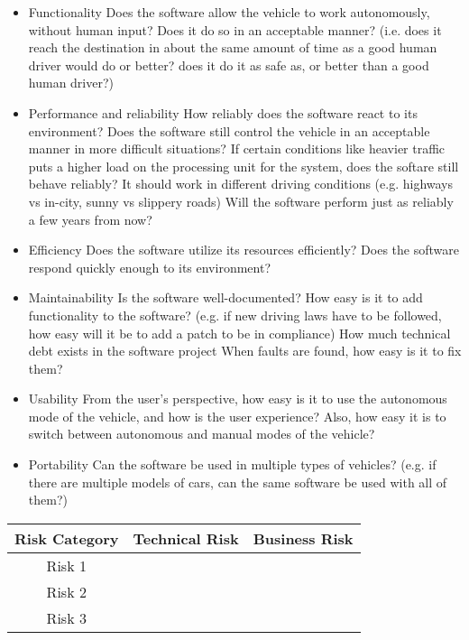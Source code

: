 \documentclass[letterpaper]{article}
\begin{document}
\begin{itemize}
	\item Functionality
		Does the software allow the vehicle to work autonomously, without human input? 
		Does it do so in an acceptable manner? 
		(i.e. does it reach the destination in about the same amount of time as a good human driver would do or better?
		does it do it as safe as, or better than a good human driver?)
	\item Performance and reliability
		How reliably does the software react to its environment?
		Does the software still control the vehicle in an acceptable manner in more difficult situations?
		If certain conditions like heavier traffic puts a higher load on the processing unit for the system, does the softare still behave reliably?
		It should work in different driving conditions (e.g. highways vs in-city, sunny vs slippery roads)
		Will the software perform just as reliably a few years from now?
	\item Efficiency
		Does the software utilize its resources efficiently?
		Does the software respond quickly enough to its environment?
	\item Maintainability
		Is the software well-documented?
		How easy is it to add functionality to the software? (e.g. if new driving laws have to be followed, how easy will it be to add a patch to be in compliance)
		How much technical debt exists in the software project
		When faults are found, how easy is it to fix them?
	\item Usability
		From the user's perspective, how easy is it to use the autonomous mode of the vehicle, and how is the user experience?
		Also, how easy it is to switch between autonomous and manual modes of the vehicle?
	\item Portability
		Can the software be used in multiple types of vehicles? 
		(e.g. if there are multiple models of cars, can the same software be used with all of them?)
\end{itemize}

\begin{table}[H]
\centering
\begin{tabular}{c|c|c|}
Risk Category & Technical Risk & Business Risk \\ \hline
Risk 1 &  &  \\ \hline
Risk 2 &  &  \\ \hline
Risk 3 &  &  \\ \hline
\end{tabular}
\end{table}
\end{document}

